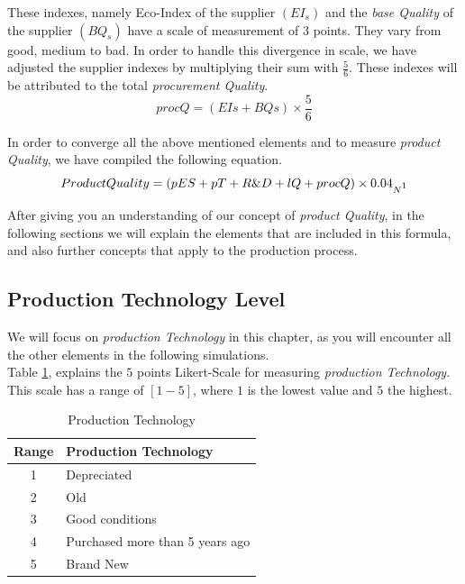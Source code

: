 These indexes, namely Eco-Index of the supplier $(EI_{s})$ and the \textit{base Quality} of the supplier $(BQ_{s})$ have a scale of measurement of $3$ points. They vary from good, medium to bad. In order to handle this divergence in scale, we have adjusted the supplier indexes by multiplying their sum with $\frac{5}{6}$. These indexes will be attributed to the total \textit{procurement Quality}.
\begin{equation}
procQ=(EIs + BQs)\times \frac{5}{6}
\end{equation}

In order to converge all the above mentioned elements and to measure \textit{product Quality}, we have compiled the following equation.
\begin{equation}
ProductQuality = (pES+pT+R\&D+lQ +procQ) \times 0.04_{N\footnotemark}
\label{eq:PQ}
\end{equation}
 
After giving you an understanding of our concept of \textit{product Quality}, in the following sections we will explain the elements that  are included in this formula, and also further concepts that apply to the production process.

\subsection{Production Technology Level}
We will focus on \textit{production Technology} in this chapter, as you will encounter all the other elements in the following simulations. \\
Table \ref{table:my-label}, explains the $5$ points Likert-Scale for measuring \textit{production Technology}. This scale has a range of $[1-5]$, where $1$ is the lowest value and $5$ the highest.

\begin{table}[ht]
\centering
\begin{tabular}{|c|l|}
\hline
 Range & Production Technology\\
\hline
 1 & Depreciated  \\
 2 & Old \\
 3 & Good conditions \\
 4 & Purchased more than 5 years ago  \\
 5 & Brand New\\
\hline
\end{tabular}
\caption{Production Technology}
\label{table:my-label}
\end{table}

